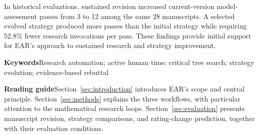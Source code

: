 In historical evaluations, sustained revision increased current-version model-assessment passes from 3 to 12 among the same 28 manuscripts. A selected evolved strategy produced more passes than the initial strategy while requiring 52.8\% fewer research invocations per pass. These findings provide initial support for EAR's approach to sustained research and strategy improvement.

\vspace{3mm}
\begingroup\small\sffamily\raggedright
\noindent\textbf{Keywords}\quad Research automation; active human time; critical tree search; strategy evolution; evidence-based rebuttal\par
\endgroup
\clearpage
{}
\tableofcontents
\thispagestyle{fancy}
\vspace{8mm}
\begin{scope}
\textbf{Reading guide}\quad Section~\ref{sec:introduction} introduces EAR's scope and central principle. Section~\ref{sec:methods} explains the three workflows, with particular attention to the mathematical research loops. Section~\ref{sec:evaluation} presents manuscript revision, strategy comparisons, and rating-change prediction, together with their evaluation conditions.
\end{scope}
\clearpage
